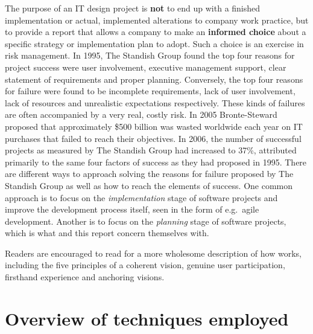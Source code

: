 The purpose of an IT design project is \textbf{not} to end up with a
finished implementation or actual, implemented alterations to company work
practice, but to provide a report that allows a company to make an
\textbf{informed choice} about a specific strategy or implementation plan to
adopt. Such a choice is an exercise in risk management. In 1995, The Standish
Group found the top four reasons for project success were user involvement,
executive management support, clear statement of requirements and proper
planning\cite{standish1995chaos}. Conversely, the top four reasons for failure
were found to be incomplete requirements, lack of user involvement, lack of
resources and unrealistic expectations respectively\cite{standish1995chaos}.
These kinds of failures are often accompanied by a very real, costly risk. In
2005 Bronte-Steward proposed that approximately \$500 billion was wasted
worldwide each year on IT purchases that failed to reach their
objectives\cite{bronte2005developing}. In 2006, the number of successful
projects as measured by The Standish Group\cite{standish2012} had increased to
37\%, attributed primarily to the same four factors of success as they had
proposed in 1995. There are different ways to approach solving the reasons for
failure proposed by The Standish Group as well as how to reach the elements of
success. One common approach is to focus on the \textit{implementation} stage of
software projects and improve the development process itself, seen in the form
of e.g.\ agile development. Another is to focus on the \textit{planning} stage
of software projects, which is what \must{} and this report concern themselves with.

Readers are encouraged to read \cite{bodker2004participatory} for a more
wholesome description of how \must{} works, including the five principles of a
coherent vision, genuine user participation, firsthand experience and anchoring
visions. 

\section{Overview of techniques employed} \label{sec:overview}

